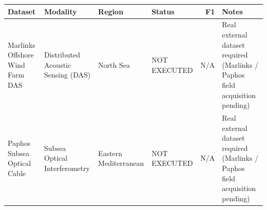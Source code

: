 \begin{tabular}{llllrl}
\toprule
Dataset & Modality & Region & Status & F1 & Notes \\
\midrule
Marlinks Offshore Wind Farm DAS & Distributed Acoustic Sensing (DAS) & North Sea & NOT EXECUTED & N/A & Real external dataset required (Marlinks / Paphos field acquisition pending) \\
Paphos Subsea Optical Cable & Subsea Optical Interferometry & Eastern Mediterranean & NOT EXECUTED & N/A & Real external dataset required (Marlinks / Paphos field acquisition pending) \\
\bottomrule
\end{tabular}
